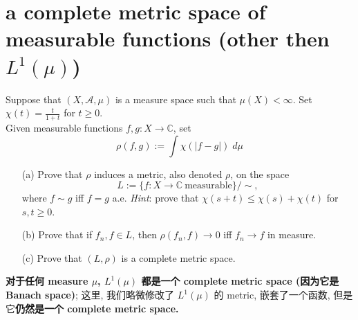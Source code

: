 \documentclass[lang=cn,11pt]{elegantbook}
\begin{document}
\section{a complete metric space of measurable functions (other then $L^1(\mu)$) }
  Suppose that $(X,\mathcal{A},\mu)$ is a measure space such that $\mu(X)<\infty$. Set $\chi(t)=\frac{t}{1+t}$ for $t\ge 0$.\\
  Given measurable functions $f,g\colon X\to\mathbb{C}$, set\[
    \rho(f,g):=\int\chi(|f-g|)\; d\mu
  \]
  \begin{itemize}
  \item[(a)]Prove that $\rho$ induces a metric, also denoted $\rho$, on the space \[
      L:=\{f\colon X\to\mathbb{C}\ \text{measurable}\}/\!\!\sim,
    \]
    where $f\sim g$ iff $f=g$ a.e. \textit{Hint}: prove that $\chi(s+t)\le\chi(s)+\chi(t)$ for $s,t\ge0$.
  \item[(b)]Prove that if $f_n,f\in L$, then $\rho(f_n,f)\to0$ iff $f_n\to f$ in measure.
  \item[(c)] Prove that $(L,\rho)$ is a complete metric space.
  \end{itemize}    
\begin{remark}





\textbf{对于任何 measure $\mu$, $L^1(\mu)$ 都是一个 complete metric space (因为它是 Banach space)}; 这里, 我们略微修改了 $L^1(\mu)$ 的 metric, 嵌套了一个函数, 但是它\textbf{仍然是一个 complete metric space.}
\end{remark}
\end{document}
